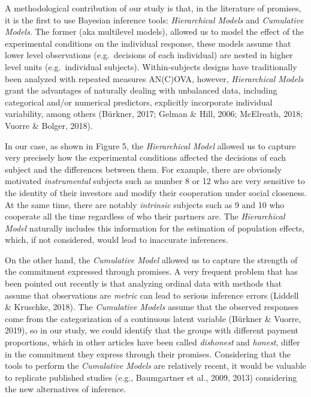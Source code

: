 \documentclass[12pt,]{article}
\begin{document}
A methodological contribution of our study is that, in the literature of
promises, it is the first to use Bayesian inference tools:
\emph{Hierarchical Models} and \emph{Cumulative Models}. The former (aka
multilevel models), allowed us to model the effect of the experimental
conditions on the individual response, these models assume that lower
level observations (e.g.~decisions of each individual) are nested in
higher level units (e.g.~individual subjects). Within-subjects designs
have traditionally been analyzed with repeated measures AN(C)OVA,
however, \emph{Hierarchical Models} grant the advantages of naturally
dealing with unbalanced data, including categorical and/or numerical
predictors, explicitly incorporate individual variability, among others
(Bürkner, 2017; Gelman \& Hill, 2006; McElreath, 2018; Vuorre \& Bolger,
2018).

In our case, as shown in Figure 5, the \emph{Hierarchical Model} allowed
us to capture very precisely how the experimental conditions affected
the decisions of each subject and the differences between them. For
example, there are obviously motivated \emph{instrumental} subjects such
as number 8 or 12 who are very sensitive to the identity of their
investors and modify their cooperation under social closeness. At the
same time, there are notably \emph{intrinsic} subjects such as 9 and 10
who cooperate all the time regardless of who their partners are. The
\emph{Hierarchical Model} naturally includes this information for the
estimation of population effects, which, if not considered, would lead
to inaccurate inferences.

On the other hand, the \emph{Cumulative Model} allowed us to capture the
strength of the commitment expressed through promises. A very frequent
problem that has been pointed out recently is that analyzing ordinal
data with methods that assume that observations are \emph{metric} can
lead to serious inference errors (Liddell \& Kruschke, 2018). The
\emph{Cumulative Models} assume that the observed responses come from
the categorization of a continuous latent variable (Bürkner \& Vuorre,
2019), so in our study, we could identify that the groups with different
payment proportions, which in other articles have been called
\emph{dishonest} and \emph{honest}, differ in the commitment they
express through their promises. Considering that the tools to perform
the \emph{Cumulative Models} are relatively recent, it would be valuable
to replicate published studies (e.g., Baumgartner et al., 2009, 2013)
considering the new alternatives of inference.
\end{document}
